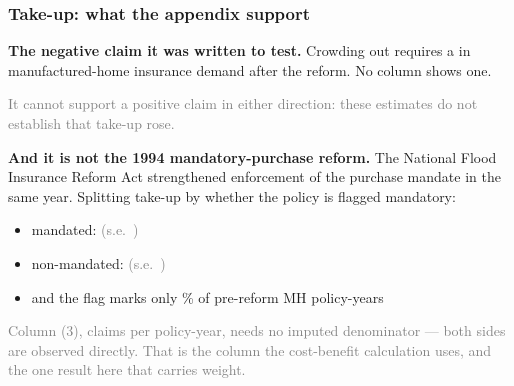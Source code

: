 \documentclass[11pt,xcolor={dvipsnames},hyperref={pdftex,pdfpagemode=UseNone,hidelinks,pdfdisplaydoctitle=true},usepdftitle=false,aspectratio=169]{beamer}
\newcommand{\gc}[1]{{\footnotesize\textcolor{gray}{#1}}}
\begin{document}
\begin{frame}[t]
    \frametitle{Take-up: what the appendix  support}

    \textbf{The negative claim it was written to test.} Crowding out requires a  in manufactured-home insurance demand after the reform. No column shows one.

    \vspace{0.6em}

    \gc{It cannot support a positive claim in either direction: these estimates do not establish that take-up rose.}

    \vspace{1.2em}
    \pause

    \textbf{And it is not the 1994 mandatory-purchase reform.} The National Flood Insurance Reform Act strengthened enforcement of the purchase mandate in the same year. Splitting take-up by whether the policy is flagged mandatory:

    \vspace{0.5em}

    \begin{itemize}\setlength{\itemsep}{0.25em}
        \item mandated: \al{\vTakeupMand} \gc{(s.e.\ \vTakeupMandSE)}
        \item non-mandated: \al{\vTakeupNonmand} \gc{(s.e.\ \vTakeupNonmandSE)}
        \item and the flag marks only \vTakeupMandSharePct\% of pre-reform MH policy-years
    \end{itemize}

    \vspace{1.2em}
    \pause

    \gc{Column (3), claims per policy-year, needs no imputed denominator --- both sides are observed directly. That is the column the cost-benefit calculation uses, and the one result here that carries weight.}

    \vfill

    \hfill \hyperlink{frame:severity}{}
\end{frame}
\end{document}
